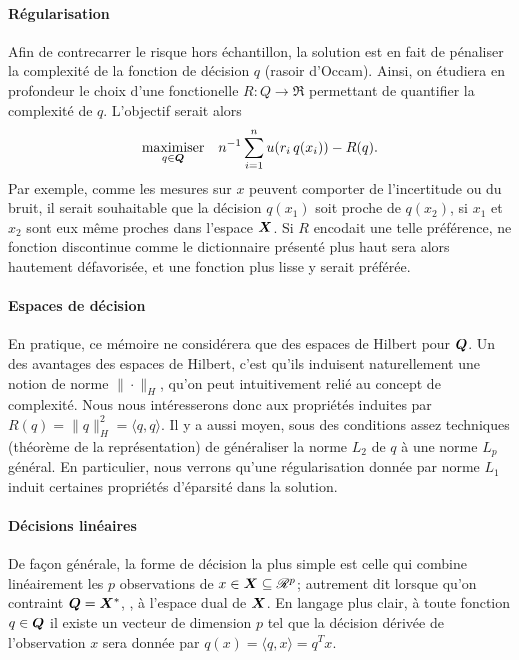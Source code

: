 \paragraph{Régularisation}

Afin de contrecarrer le risque hors échantillon, la solution est en fait de pénaliser la
complexité de la fonction de décision $q$ (rasoir d'Occam). Ainsi, on étudiera en
profondeur le choix d'une fonctionelle $R : Q \to \Re$ permettant de quantifier la complexité
de $q$. L'objectif serait alors
\begin{equation}
  \maximizeEquation[q \in \Q]{n^{-1} \sumi u(r_i\, q(x_i)) - R(q).}
\end{equation}
Par exemple, comme les mesures sur $x$ peuvent comporter de l'incertitude ou du bruit, il
serait souhaitable que la décision $q(x_1)$ soit proche de $q(x_2)$, si $x_1$ et $x_2$
sont eux même proches dans l'espace $\X$. Si $R$ encodait une telle préférence, ne
fonction discontinue comme le dictionnaire présenté plus haut sera alors hautement
défavorisée, et une fonction plus lisse y serait préférée.




\paragraph{Espaces de décision}

En pratique, ce mémoire ne considérera que des espaces de Hilbert pour $\Q$. Un des
avantages des espaces de Hilbert, c'est qu'ils induisent naturellement une notion de norme
$\|\cdot\|_H$, qu'on peut intuitivement relié au concept de complexité. Nous nous
intéresserons donc aux propriétés induites par $R(q) = \|q\|_H^2 = \langle q, q \rangle$. Il y a
aussi moyen, sous des conditions assez techniques (théorème de la représentation) de
généraliser la norme $L_2$ de $q$ à une norme $L_p$ général. En particulier, nous verrons
qu'une régularisation donnée par norme $L_1$ induit certaines propriétés d'éparsité dans
la solution.


\paragraph{Décisions linéaires}

De façon générale, la forme de décision la plus simple est celle qui combine linéairement
les $p$ observations de $x \in \X \subseteq \Re^p$; autrement dit lorsque qu'on contraint
$\Q = \X^*$, \ie, à l'espace dual de $\X$. En langage plus clair, à toute fonction
$q \in \Q$ il existe un vecteur de dimension $p$ tel que la décision dérivée de
l'observation $x$ sera donnée par $q(x) = \langle q, x \rangle = q^Tx$.

